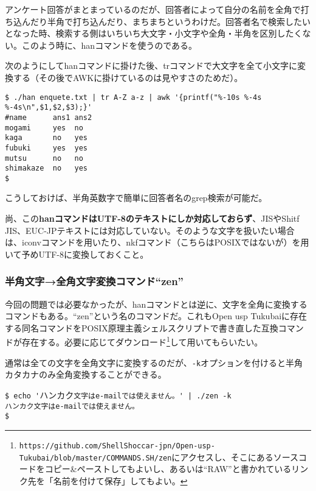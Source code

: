 アンケート回答がまとまっているのだが、回答者によって自分の名前を全角で打ち込んだり半角で打ち込んだり、まちまちというわけだ。回答者名で検索したいとなった時、検索する側はいちいち大文字・小文字や全角・半角を区別したくない。このよう時に、hanコマンドを使うのである。

次のようにしてhanコマンドに掛けた後、trコマンドで大文字を全て小文字に変換する（その後でAWKに掛けているのは見やすさのためだ）。
\begin{screen}
	\verb!$ ./han enquete.txt | tr A-Z a-z | awk '{printf("%-10s %-4s %-4s\n",$1,$2,$3);}'!\return \\
	\verb|#name      ans1 ans2| \\
	\verb|mogami     yes  no  | \\
	\verb|kaga       no   yes | \\
	\verb|fubuki     yes  yes | \\
	\verb|mutsu      no   no  | \\
	\verb|shimakaze  no   yes | \\
	\verb|$ |
\end{screen}

こうしておけば、半角英数字で簡単に回答者名のgrep検索が可能だ。

尚、この\textbf{hanコマンドはUTF-8のテキストにしか対応しておらず}、JISやShitf JIS、EUC-JPテキストには対応していない。そのような文字を扱いたい場合は、iconvコマンドを用いたり、nkfコマンド（こちらはPOSIXではないが）を用いて予めUTF-8に変換しておくこと。

\subsubsection*{半角文字→全角文字変換コマンド``zen''}

今回の問題では必要なかったが、hanコマンドとは逆に、文字を全角に変換するコマンドもある。``zen''という名のコマンドだ。これもOpen usp Tukubaiに存在する同名コマンドをPOSIX原理主義シェルスクリプトで書き直した互換コマンドが存在する。必要に応じてダウンロード\footnote{\verb|https://github.com/ShellShoccar-jpn/Open-usp-Tukubai/blob/master/COMMANDS.SH/zen|にアクセスし、そこにあるソースコードをコピー\&{}ペーストしてもよいし、あるいは``RAW''と書かれているリンク先を「名前を付けて保存」してもよい。}して用いてもらいたい。

通常は全ての文字を全角文字に変換するのだが、\verb|-k|オプションを付けると半角カタカナのみ全角変換することができる。
\begin{screen}
	\verb!$ echo '!$\!\!\!${\footnotesize ハ}$\!\!\!\!${\footnotesize ン}$\!\!\!\!${\footnotesize カ}$\!\!\!\!${\footnotesize ク}\verb!文字はe-mailでは使えません。' | ./zen -k!\return \\
	\verb|ハンカク文字はe-mailでは使えません。| \\
	\verb|$ |
\end{screen}

